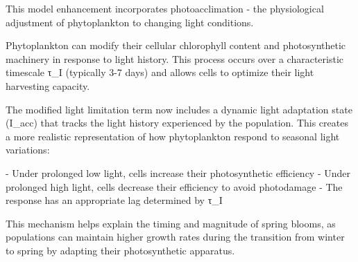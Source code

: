 This model enhancement incorporates photoacclimation - the physiological adjustment of phytoplankton to changing light conditions. 

Phytoplankton can modify their cellular chlorophyll content and photosynthetic machinery in response to light history. This process occurs over a characteristic timescale τ_I (typically 3-7 days) and allows cells to optimize their light harvesting capacity.

The modified light limitation term now includes a dynamic light adaptation state (I_acc) that tracks the light history experienced by the population. This creates a more realistic representation of how phytoplankton respond to seasonal light variations:

- Under prolonged low light, cells increase their photosynthetic efficiency
- Under prolonged high light, cells decrease their efficiency to avoid photodamage
- The response has an appropriate lag determined by τ_I

This mechanism helps explain the timing and magnitude of spring blooms, as populations can maintain higher growth rates during the transition from winter to spring by adapting their photosynthetic apparatus.
